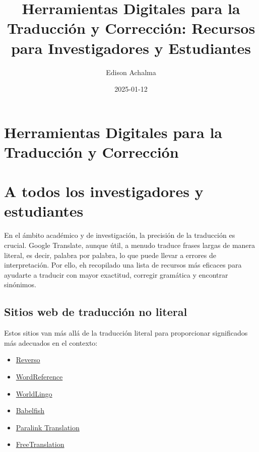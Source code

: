 \documentclass[
  jou,
  floatsintext,
  longtable,
  a4paper,
  nolmodern,
  notxfonts,
  notimes,
  colorlinks=true,linkcolor=blue,citecolor=blue,urlcolor=blue]{apa7}
\title{Herramientas Digitales para la Traducción y Corrección: Recursos
para Investigadores y Estudiantes}
\author{Edison Achalma}
\affiliation{
{Escuela Profesional de Economía, Universidad Nacional de San Cristóbal
de Huamanga}}
\date{2025-01-12}
\providecommand{\tightlist}{%
  \setlength{\itemsep}{0pt}\setlength{\parskip}{0pt}}
\begin{document}
\maketitle

\hypertarget{toc}{}
\tableofcontents
\newpage
\section[Introduction]{Herramientas Digitales para la Traducción y
Corrección}

\setcounter{secnumdepth}{-\maxdimen} %

\setlength\LTleft{0pt}


\section{A todos los investigadores y
estudiantes}\label{a-todos-los-investigadores-y-estudiantes}

En el ámbito académico y de investigación, la precisión de la traducción
es crucial. Google Translate, aunque útil, a menudo traduce frases
largas de manera literal, es decir, palabra por palabra, lo que puede
llevar a errores de interpretación. Por ello, eh recopilado una lista de
recursos más eficaces para ayudarte a traducir con mayor exactitud,
corregir gramática y encontrar sinónimos.

\subsection{Sitios web de traducción no
literal}\label{sitios-web-de-traducciuxf3n-no-literal}

Estos sitios van más allá de la traducción literal para proporcionar
significados más adecuados en el contexto:

\begin{itemize}
\tightlist
\item
  \href{http://mobile.reverso.net/en}{Reverso}
\item
  \href{https://www.wordreference.com/}{WordReference}
\item
  \href{http://www.worldlingo.com/}{WorldLingo}
\item
  \href{https://www.babelfish.com/}{Babelfish}
\item
  \href{http://translation2.paralink.com/}{Paralink Translation}
\item
  \href{https://www.freetranslation.com/}{FreeTranslation}
\end{itemize}
\end{document}
